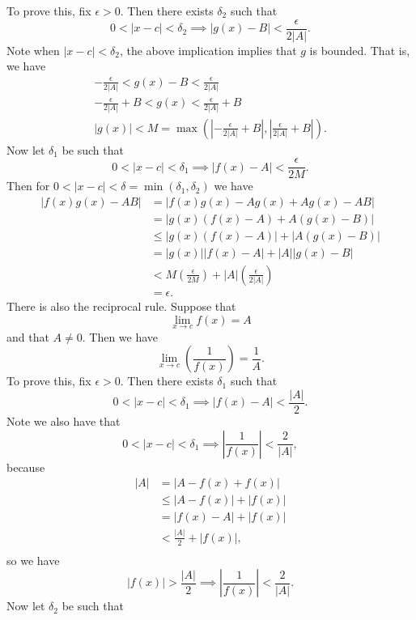 \documentclass{article}[11pt]
\newcommand{\eps}{\epsilon}
\begin{document}
    To prove this, fix $\epsilon > 0$. Then there exists $\delta_2$ such that
    $$ 0 < |x - c| < \delta_2 \implies |g(x) - B| < \frac{\eps}{2|A|} .$$
    Note when $|x - c| < \delta_2$, the above implication implies that $g$ is bounded. That is, we have
    \begin{align*}
        -\frac{\eps}{2|A|} < g(x) - B < \frac{\eps}{2|A|} \\
        -\frac{\eps}{2|A|} + B < g(x) < \frac{\eps}{2|A|} + B \\
        |g(x)| < M = \max\left(\left|-\frac{\eps}{2|A|} + B\right|, \left|\frac{\eps}{2|A|} + B\right|\right).
    \end{align*}
    Now let $\delta_1$ be such that
    $$ 0 < |x - c| < \delta_1 \implies |f(x) - A| < \frac{\eps}{2M} .$$
    Then for $0 < |x - c| < \delta = \min(\delta_1, \delta_2)$ we have
    \begin{align*}
        |f(x)g(x) - AB| &= |f(x)g(x) - Ag(x) + Ag(x) - AB| \\
                        &= |g(x)(f(x) - A) + A(g(x) - B)| \\
                        &\leq |g(x)(f(x) - A)| + |A(g(x) - B)| \\
                        &= |g(x)||f(x) - A| + |A||g(x) - B| \\
                        &< M\left(\frac{\eps}{2M}\right) + |A|\left(\frac{\eps}{2|A|}\right) \\
                        &= \eps.
    \end{align*}
    There is also the reciprocal rule. Suppose that
    $$ \lim_{x \to c} f(x) = A $$
    and that $A \neq 0$. Then we have
    $$ \lim_{x \to c} \left(\frac{1}{f(x)}\right) = \frac{1}{A} .$$
    To prove this, fix $\eps > 0$. Then there exists $\delta_1$ such that
    $$ 0 < |x - c| < \delta_1 \implies |f(x) - A| < \frac{|A|}{2} . $$
    Note we also have that
        $$ 0 < |x - c| < \delta_1 \implies \left| \frac{1}{f(x)} \right| < \frac{2}{|A|} ,$$
    because
    \begin{align*}
        |A| &= |A - f(x) + f(x)| \\
            &\leq |A - f(x)| + |f(x)| \\
            &= |f(x) - A| + |f(x)| \\
            &< \frac{|A|}{2} + |f(x)| ,\\
    \end{align*}
    so we have
    $$ |f(x)| > \frac{|A|}{2} \implies \left| \frac{1}{f(x)} \right| < \frac{2}{|A|} .$$
    Now let $\delta_2$ be such that
\end{document}
